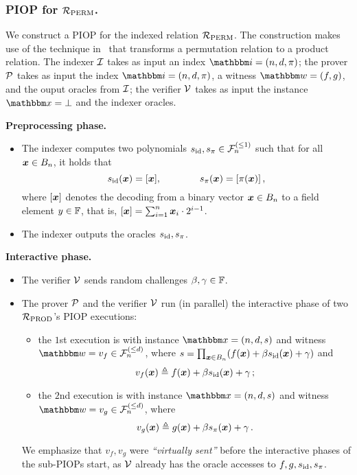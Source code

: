 \subsubsection*{PIOP for ${\mathcal{R}}_{\text{PERM}}$.}
We construct a PIOP for the indexed relation ${\mathcal{R}}_{\text{PERM}}$.
The construction makes use of the technique in~\cite{GWC19} that 
transforms a permutation relation to a product relation.
The indexer $\mathcal{I}$ takes as input an index $\idxR = (n, d, \perm)$;
the prover $\mathcal{P}$ takes as input the index $\idxR = (n, d, \perm)$,
a witness $\witR = (f, g)$, and the ouput oracles from $\mathcal{I}$;
the verifier $\mathcal{V}$ takes as input the instance $\instR = \bot$ and 
the indexer oracles.

\textbf{Preprocessing phase.}
\begin{itemize}
    \item The indexer computes two polynomials $s_{\text{id}}, s_{\pi} \in {\mathcal{F}}_{n}^{(\le{1})}$ such that
    for all $\boldsymbol{x} \in B_{n}$, it holds that 
    \[
        s_{\text{id}}(\boldsymbol{x}) = [\boldsymbol{x}], \qquad\qquad s_{\pi}(\boldsymbol{x}) = [\pi(\boldsymbol{x})]\,,
    \]
    where $[\boldsymbol{x}]$ denotes the decoding from a binary vector $\boldsymbol{x} \in B_{n}$
    to a field element $y \in \mathbb{F}$, that is, $[\boldsymbol{x}] = \sum_{i=1}^{n} \boldsymbol{x}_i \cdot 2^{i-1}$.
    \item The indexer outputs the oracles $s_{\text{id}}, s_{\pi}$.
\end{itemize}

\textbf{Interactive phase.} 
\begin{itemize}
    \item The verifier $\mathcal{V}$ sends random challenges $\beta, \gamma \in \mathbb{F}$.
    \item The prover $\mathcal{P}$ and the verifier $\mathcal{V}$ run (in parallel) the interactive phase 
    of two ${\mathcal{R}}_{\text{PROD}}$'s PIOP executions:
        \begin{itemize}
            \item the $1$st execution is with instance $\instR = (n, d, s)$ and
                witness $\witR = v_{f} \in \bdp{n}{d}$, where 
                $
                    s = \prod_{\boldsymbol{x}\in B_{n}} (f(\boldsymbol{x}) + \beta s_{\text{id}}(\boldsymbol{x}) + \gamma)
                $ and
                \[
                    v_{f}(\boldsymbol{x}) \mathrel{\triangleq} f(\boldsymbol{x}) + \beta s_{\text{id}}(\boldsymbol{x}) + \gamma \,;
                \]
            \item the $2$nd execution is with instance $\instR = (n, d, s)$ and 
                witness $\witR = v_{g} \in \bdp{n}{d}$, where 
                \[
                    v_{g}(\boldsymbol{x}) \mathrel{\triangleq} g(\boldsymbol{x}) + \beta s_{\pi}(\boldsymbol{x}) + \gamma \,.
                \]
        \end{itemize}
        We emphasize that $v_{f}, v_{g}$ were \emph{``virtually sent''} before the interactive phases of the sub-PIOPs start,
        as $\mathcal{V}$ already has the oracle accesses to $f, g, s_{\text{id}}, s_{\pi}$.
\end{itemize}

